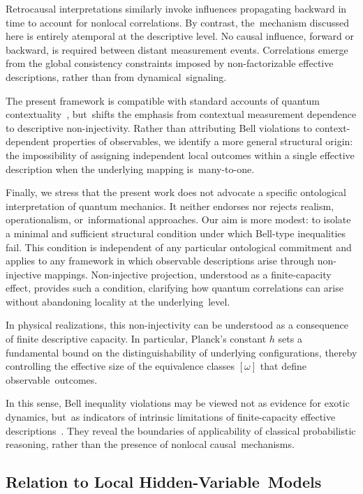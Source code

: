\documentclass[11pt,a4paper]{article}
\theoremstyle{remark}
\begin{document}
  Retrocausal interpretations similarly invoke influences propagating backward in time
  to account for nonlocal correlations.
  By contrast, the~mechanism discussed here is entirely atemporal at the descriptive
  level.
  No causal influence, forward or backward, is required between distant measurement
  events.
  Correlations emerge from the global consistency constraints imposed by non-factorizable
  effective descriptions, rather than from dynamical~signaling.

  The present framework is compatible with standard accounts of quantum
  contextuality~\cite{KochenSpecker1967}, but~shifts the emphasis from contextual measurement
  dependence to descriptive non-injectivity.
  Rather than attributing Bell violations to context-dependent properties of observables,
  we identify a more general structural origin: the impossibility of assigning
  independent local outcomes within a single effective description when the underlying
  mapping is~many-to-one.

  Finally, we stress that the present work does not advocate a specific ontological
  interpretation of quantum mechanics.
  It neither endorses nor rejects realism, operationalism, or~informational approaches.
  Our aim is more modest: to isolate a minimal and sufficient structural condition under
  which Bell-type inequalities fail.
  This condition is independent of any particular ontological commitment and applies
  to any framework in which observable descriptions arise through non-injective mappings.
  Non-injective projection, understood as a finite-capacity effect, provides such a
  condition, clarifying how quantum correlations can arise without abandoning locality
  at the underlying~level.

  In physical realizations, this non-injectivity can be understood as a consequence
  of finite descriptive capacity.
  In particular, Planck's constant $h$ sets a fundamental bound on the
  distinguishability of underlying configurations, thereby controlling the effective
  size of the equivalence classes $[\omega]$ that define observable~outcomes.

  In this sense, Bell inequality violations may be viewed not as evidence for exotic
  dynamics, but~as indicators of intrinsic limitations of finite-capacity effective
  descriptions~\cite{Spekkens2007Epistemic}.
  They reveal the boundaries of applicability of classical probabilistic reasoning,
  rather than the presence of nonlocal causal~mechanisms.

  \subsection{Relation to Local Hidden-Variable~Models}
    \label{subsec:lhv-relation}
\end{document}
